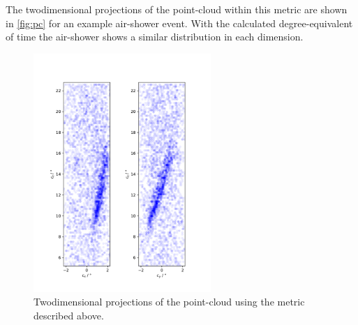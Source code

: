 The twodimensional projections of the point-cloud within this metric are shown
in \autoref{fig:pc} for an example air-shower event. With the calculated
degree-equivalent of time the air-shower shows a similar distribution in
each dimension.
%
\begin{figure}[H]
  \centering
  \includegraphics[width=0.6\textwidth, angle=-90]{Plots/point_cloud.pdf}
  \caption{Twodimensional projections of the point-cloud using the metric described above.}
  \label{fig:pc}
\end{figure}
%

